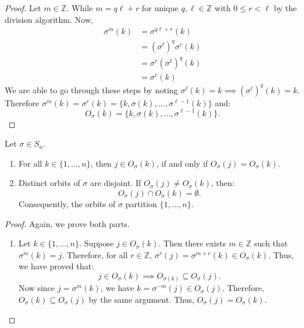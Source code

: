 \begin{itemize}
\begin{proof}
        Let $m\in \mathbb{Z}$. While $m=q\ell + r$ for unique $q,\ell \in \mathbb{Z}$ with $0\le r < \ell$ by the division algorithm. Now,
        \begin{align}
            \sigma^{m}(k) &= \sigma^{q\ell + r}(k) \\ 
            &= (\sigma^\ell)^q \sigma^{r}(k) \\ 
            &= \sigma^r(\sigma^\ell)^q(k) \\ 
            &= \sigma^r(k)
        \end{align}
        We are able to go through these steps by noting $\sigma^\ell(k) = k\implies (\sigma^\ell)^q(k)=k$. Therefore $\sigma^m(k) = \sigma^r(k)=\{k,\sigma(k),\dots,\sigma^{\ell-1}(k)\}$ and:
        \begin{equation}
            O_{\sigma}(k) = \{k,\sigma(k),\dots, \sigma^{\ell-1}(k)\}.
        \end{equation}
    \end{proof}
    \begin{proposition}
        Let $\sigma \in S_n$.
        \begin{enumerate}
            \item For all $k\in \{1,\dots,n\}$, then $j\in O_\sigma(k)$, if and only if $O_\sigma(j) = O_\sigma(k)$.
            \item Distinct orbits of $\sigma$ are disjoint. If $O_{\sigma}(j) \neq O_\sigma(k)$, then:
            \begin{equation}
                O_{\sigma}(j) \cap O_{\sigma}(k) = \emptyset.
            \end{equation}
            Consequently, the orbits of $\sigma$ partition $\{1,\dots,n\}$.
        \end{enumerate}
    \end{proposition}
    \begin{proof}
        Again, we prove both parts.
        \begin{enumerate}
            \item Let $k\in \{1,\dots, n\}$. Suppose $j\in O_{\sigma}(k)$. Then there exists $m\in \mathbb{Z}$ such that $\sigma^{m}(k)=j$. Therefore, for all $r\in \mathbb{Z}$, $\sigma^{r}(j)=\sigma^{m+r}(k) \in O_{\sigma}(k)$. Thus, we have proved that:
            \begin{equation}
                j\in O_{\sigma}(k) \implies O_{\sigma(k)} \subseteq O_{\sigma}(j).
            \end{equation}
            Now since $j = \sigma^{m}(k)$, we have $k = \sigma^{-m}(j) \in O_{\sigma}(j)$. Therefore, $O_\sigma(k) \subseteq O_{\sigma}(j)$ by the same argument. Thus, $O_\sigma(j) = O_\sigma(k).$
            

\end{enumerate}
\end{proof}
\end{itemize}
